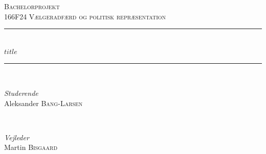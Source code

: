 %
%
%
%


	\newcommand{\HRule}{\rule{\linewidth}{0.5mm}} %

	\center %


	\vspace*{1cm}

	\textsc{\Large Bachelorprojekt}\\[0.5cm] %

	\textsc{\large 166F24 Vælgeradfærd og politisk repræsentation}\\[0.5cm] %




	\HRule\\[0.4cm]

	{\huge\bfseries $title$}\\[0.4cm] %

	\HRule\\[1.5cm]


	\begin{minipage}{0.4\textwidth}
		\begin{flushleft}
			\large
			\textit{Studerende}\\
			Aleksander \textsc{Bang-Larsen} %
		\end{flushleft}
	\end{minipage}
	~
	\begin{minipage}{0.4\textwidth}
		\begin{flushright}
			\large
			\textit{Vejleder}\\
			Martin \textsc{Bisgaard} %
		\end{flushright}
	\end{minipage}

